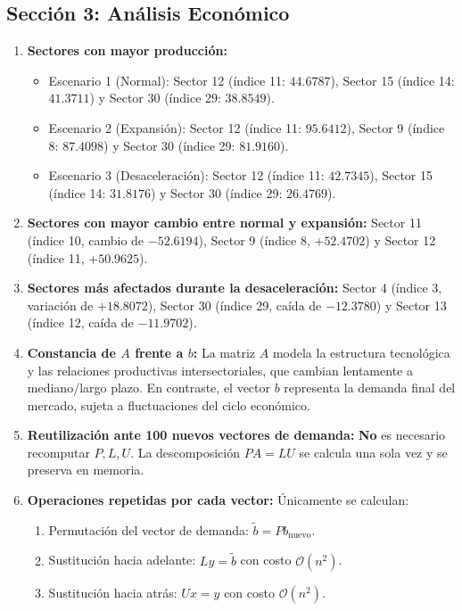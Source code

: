 \documentclass[11pt,a4paper]{article}
\theoremstyle{definition}
\theoremstyle{remark}
\begin{document}
\subsection{Sección 3: Análisis Económico}
\begin{enumerate}[leftmargin=*]
    \item \textbf{Sectores con mayor producción:}
    \begin{itemize}
        \item Escenario 1 (Normal): Sector 12 (índice 11: $44.6787$), Sector 15 (índice 14: $41.3711$) y Sector 30 (índice 29: $38.8549$).
        \item Escenario 2 (Expansión): Sector 12 (índice 11: $95.6412$), Sector 9 (índice 8: $87.4098$) y Sector 30 (índice 29: $81.9160$).
        \item Escenario 3 (Desaceleración): Sector 12 (índice 11: $42.7345$), Sector 15 (índice 14: $31.8176$) y Sector 30 (índice 29: $26.4769$).
    \end{itemize}
    \item \textbf{Sectores con mayor cambio entre normal y expansión:} Sector 11 (índice 10, cambio de $-52.6194$), Sector 9 (índice 8, $+52.4702$) y Sector 12 (índice 11, $+50.9625$).
    \item \textbf{Sectores más afectados durante la desaceleración:} Sector 4 (índice 3, variación de $+18.8072$), Sector 30 (índice 29, caída de $-12.3780$) y Sector 13 (índice 12, caída de $-11.9702$).
    \item \textbf{Constancia de $A$ frente a $b$:} La matriz $A$ modela la estructura tecnológica y las relaciones productivas intersectoriales, que cambian lentamente a mediano/largo plazo. En contraste, el vector $b$ representa la demanda final del mercado, sujeta a fluctuaciones del ciclo económico.
    \item \textbf{Reutilización ante 100 nuevos vectores de demanda:} \textbf{No} es necesario recomputar $P, L, U$. La descomposición $PA = LU$ se calcula una sola vez y se preserva en memoria.
    \item \textbf{Operaciones repetidas por cada vector:} Únicamente se calculan:
    \begin{enumerate}
        \item Permutación del vector de demanda: $\tilde{b} = P b_{\text{nuevo}}$.
        \item Sustitución hacia adelante: $Ly = \tilde{b}$ con costo $\mathcal{O}(n^2)$.
        \item Sustitución hacia atrás: $Ux = y$ con costo $\mathcal{O}(n^2)$.
    \end{enumerate}
\end{enumerate}
\end{document}
